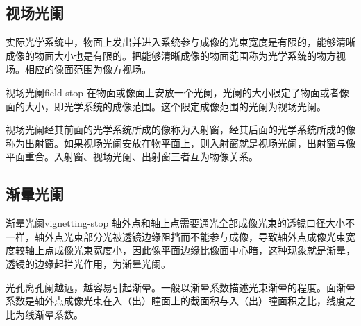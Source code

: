 \documentclass[cn,10pt,chinesefont=founder,math=newtx,cite=super,twoside]{elegantbook}
\begin{document}
\subsection{视场光阑}
\label{subsect:field-stop}
实际光学系统中，物面上发出并进入系统参与成像的光束宽度是有限的，能够清晰成像的物面大小也是有限的。把能够清晰成像的物面范围称为光学系统的物方视场。相应的像面范围为像方视场。

\begin{definition}{视场光阑}{field-stop}
	在物面或像面上安放一个光阑，光阑的大小限定了物面或者像面的大小，即光学系统的成像范围。这个限定成像范围的光阑为视场光阑。
\end{definition}

视场光阑经其前面的光学系统所成的像称为入射窗，经其后面的光学系统所成的像称为出射窗。如果视场光阑安放在物平面上，则入射窗就是视场光阑，出射窗与像平面重合。入射窗、视场光阑、出射窗三者互为物像关系。

\subsection{渐晕光阑}
\label{subsect:vignetting-stop}
\begin{definition}{渐晕光阑}{vignetting-stop}
轴外点和轴上点需要通光全部成像光束的透镜口径大小不一样，轴外点光束部分光被透镜边缘阻挡而不能参与成像，导致轴外点成像光束宽度较轴上点成像光束宽度小，因此像平面边缘比像面中心暗，这种现象就是渐晕，透镜的边缘起拦光作用，为渐晕光阑。
\end{definition}

光孔离孔阑越远，越容易引起渐晕。一般以渐晕系数描述光束渐晕的程度。面渐晕系数是轴外点成像光束在入（出）瞳面上的截面积与入（出）瞳面积之比，线度之比为线渐晕系数。
\end{document}
